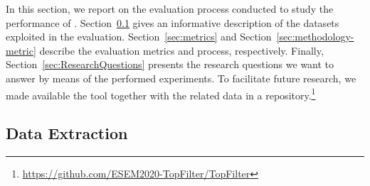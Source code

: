 





In this section, we report on the evaluation process conducted to study the performance of \TF. 
Section~\ref{sec:Dataset} 
gives an informative description of the datasets exploited in the evaluation. 
Section~\ref{sec:metrics} and Section~\ref{sec:methodology-metric} describe the 
evaluation metrics and process, respectively. %
Finally, Section~\ref{sec:ResearchQuestions} presents the research questions we want to 
answer by means of the performed experiments. To facilitate future research, we made available 
the \TF tool together with the related data in a \GH 
repository.\footnote{\url{https://github.com/ESEM2020-TopFilter/TopFilter}}



\subsection{Data Extraction} \label{sec:Dataset}









